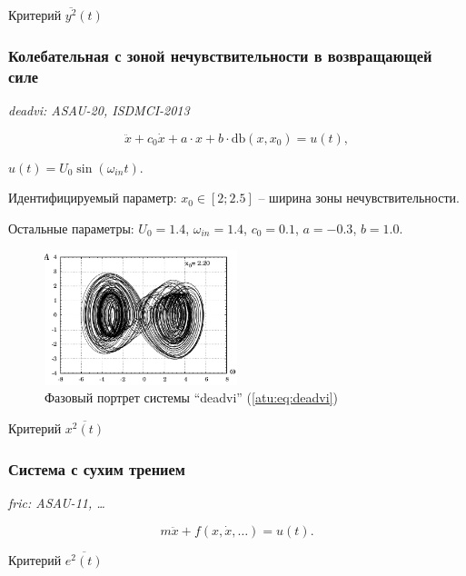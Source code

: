 \documentclass[a4paper,12pt]{article}
\newcommand{\LinkRef}[1]{ \textit{#1} }
\begin{document}
Критерий
$\overline{y^2}(t)$



\FloatBarrier

\subsubsection{Колебательная с зоной нечувствительности в возвращающей силе} %

\LinkRef{
  deadvi: ASAU-20, ISDMCI-2013
}

\begin{equation}
\ddot{x} + c_0 \dot{x} + a \cdot x + b \cdot \mathrm{db}(x,x_0) = u(t),
\label{atu:eq:deadvi}
\end{equation}

$ u(t) = U_0 \sin( \omega_{in} t ) $.

Идентифицируемый параметр:
$ x_0 \in [2;2.5] $ -- ширина зоны нечувствительности.

Остальные параметры:
$U_0 = 1.4$, $\omega_{in} = 1.4$, $c_0=0.1$, $a=-0.3$, $b=1.0$.


\begin{figure}[htb!]
\centerline{\includegraphics[width=0.5\textwidth]{p/cha/deadvi_phase.pdf} }
\caption{Фазовый портрет системы ``deadvi'' (\ref{atu:eq:deadvi})}
\label{atu:f:deadvi_phase}
\end{figure}

Критерий
$\overline{x^2(t)}$



\FloatBarrier
\subsubsection{Система с сухим трением}

\LinkRef{
  fric: ASAU-11, \ldots
}

\begin{equation}
 m \ddot{x} + f( x, \dot{x}, \ldots)  = u(t).
\label{atu:eq:dryfric_example}
\end{equation}

Критерий
$\overline{e^2(t)}$
\end{document}
